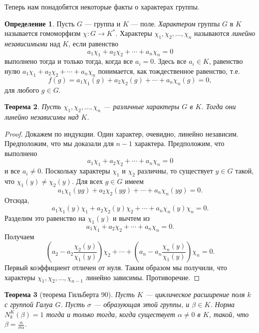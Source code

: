 \documentclass[12pt, titlepage, oneside]{amsbook}
\newtheorem{theorem}{Теорема}[chapter]
\theoremstyle{definition}
\newtheorem{definition}[theorem]{Определение}
\theoremstyle{remark}
\begin{document}
Теперь нам понадобятся некоторые факты о характерах группы.

\begin{definition}
Пусть $G$ --- группа и $K$ --- поле. \emph{Характером} группы $G$ в $K$ называется гомоморфизм $\chi\colon G\rightarrow K^*$. Характеры $\chi_1,\chi_2,\ldots,\chi_n$ называются \emph{линейно независимыми} над $K$, если равенство $$a_1\chi_1+a_2\chi_2+\cdots+a_n\chi_n=0$$ выполнено тогда и только тогда, когда все $a_i=0$. Здесь все $a_i\in K$, равенство нулю $a_1\chi_1+a_2\chi_2+\cdots+a_n\chi_n$ понимается, как тождественное равенство, т.е. $$f(g)=a_1\chi_1(g)+a_2\chi_2(g)+\cdots+a_n\chi_n(g)=0,$$ для любого $g\in G$.
\end{definition}

\begin{theorem}
\label{Har1}
Пусть $\chi_1,\chi_2,\ldots,\chi_n$ --- различные характеры $G$ в $K$. Тогда они линейно независимы над $K$.
\end{theorem}

\begin{proof}
Докажем по индукции. Один характер, очевидно, линейно независим. Предположим, что мы доказали для $n-1$ характера. Предположим, что выполнено $$a_1\chi_1+a_2\chi_2+\cdots+a_n\chi_n=0$$ и все $a_i\neq 0$. Поскольку характеры $\chi_1$ и $\chi_2$ различны, то существует $y\in G$ такой, что $\chi_1(y)\neq\chi_2(y)$. Для всех $g\in G$ имеем $$a_1\chi_1(yg)+a_2\chi_2(yg)+\cdots+a_n\chi_n(yg)=0.$$ Отсюда, $$a_1\chi_1(y)\chi_1+a_2\chi_2(y)\chi_2+\cdots+a_n\chi_n(y)\chi_n=0.$$ Разделим это равенство на $\chi_1(y)$ и вычтем из $$a_1\chi_1+a_2\chi_2+\cdots+a_n\chi_n=0.$$ Получаем $$\left(a_2-a_2\frac{\chi_2(y)}{\chi_1(y)}\right)\chi_2+\cdots+\left(a_n-a_n\frac{\chi_n(y)}{\chi_1(y)}\right)\chi_n=0.$$ Первый коэффициент отличен от нуля. Таким образом мы получили, что характеры $\chi_1,\chi_2,\ldots,\chi_{n-1}$ линейно зависимы. Противоречие.
\end{proof}

\begin{theorem}[теорема Гильберта 90]
\label{NorGil}
Пусть $K$ --- циклическое расширение поля $k$ с группой Галуа $G$. Пусть $\sigma$ --- образующая этой группы, и $\beta\in K$. Норма $N_k^K(\beta)=1$ тогда и только тогда, когда существует $\alpha\neq 0$ в $K$, такой, что $\beta=\frac{\alpha}{\sigma \alpha}$.
\end{theorem}
\end{document}
